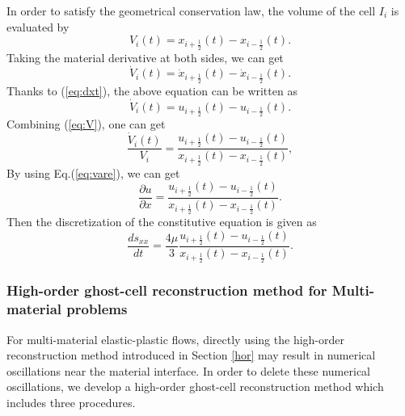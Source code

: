\documentclass[review]{elsarticle}
\begin{document}
In order to satisfy the geometrical conservation law, the volume of the cell $I_i$ is evaluated by
\begin{equation}\label{eq:V}
  V_i(t) = x_{i+\frac{1}{2}}(t) - x_{i-\frac{1}{2}}(t).
\end{equation}
Taking the material derivative at both sides, we can get
\begin{equation}\label{eq:dotV}
  \dot{V}_i(t) = \dot{x}_{i+\frac{1}{2}}(t) - \dot{x}_{i-\frac{1}{2}}(t).
\end{equation}
Thanks to (\ref{eq:dxt}), the above equation can be written as
\begin{equation}\label{eq:dotV}
  \dot{V}_i(t) = u_{i+\frac{1}{2}}(t) - u_{i-\frac{1}{2}}(t).
\end{equation}
Combining (\ref{eq:V}), one can get
\begin{equation}
  \frac{\dot{V}_i(t)}{V_i} =\frac{ u_{i+\frac{1}{2}}(t) - u_{i-\frac{1}{2}}(t)}{ x_{i+\frac{1}{2}}(t) - x_{i-\frac{1}{2}}(t)},
\end{equation}
By using Eq.(\ref{eq:vare}), we can get
\begin{equation}
  \frac{\partial u}{\partial x} =\frac{ u_{i+\frac{1}{2}}(t) - u_{i-\frac{1}{2}}(t)}{ x_{i+\frac{1}{2}}(t) - x_{i-\frac{1}{2}}(t)}.
\end{equation}
Then  the  discretization of the constitutive equation is given as
\begin{equation}\label{eq:semSxx}
  \frac{d s_{xx}}{dt } =\frac{4\mu}{3} \frac{ u_{i+\frac{1}{2}}(t) - u_{i-\frac{1}{2}}(t)}{ x_{i+\frac{1}{2}}(t) - x_{i-\frac{1}{2}}(t)}.
\end{equation}


\subsubsection{High-order ghost-cell reconstruction method for Multi-material problems} \label{sec:ghostcell}

For multi-material elastic-plastic flows, directly using the high-order reconstruction method introduced in  Section \ref{hor} may result in numerical oscillations near the material interface. In order to delete these numerical oscillations, we develop a high-order ghost-cell reconstruction method which includes three procedures.
\end{document}
